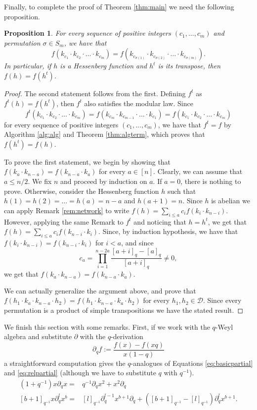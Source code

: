\documentclass[10pt]{amsart}
\newtheorem{Prop}[Lem]{Proposition}
\theoremstyle{definition}
\newcommand{\D}{\mathcal{D}}
\begin{document}
Finally, to complete the proof of Theorem \ref{thm:main} we need the following proposition.
\begin{Prop}
For every sequence of positive integers $(c_1,\ldots, c_m)$ and permutation $\sigma\in S_m$, we have that
\[
f(k_{c_1}\cdot k_{c_2}\cdot\ldots \cdot k_{c_m})=f(k_{c_{\sigma(1)}}\cdot k_{c_{\sigma(2)}}\cdot\ldots\cdot k_{c_{\sigma(m)}}).
\]
In particular, if $h$ is a Hessenberg function and $h^t$ is its transpose, then $f(h)=f(h^t)$.
\end{Prop}
\begin{proof}
The second statement follows from the first. Defining $f^t$ as $f^t(h)=f(h^t)$, then $f^t$ also satisfies the modular law. Since
\[
f^t(k_{c_1}\cdot k_{c_2}\cdot\ldots \cdot k_{c_m})=f(k_{c_m}\cdot k_{c_{m-1}}\cdot\ldots \cdot k_{c_1})=f(k_{c_1}\cdot k_{c_2}\cdot\ldots \cdot k_{c_m})
\]
for every sequence of positive integers $(c_1,\ldots, c_m)$, we have that $f^t=f$ by Algorithm \ref{alg:alg} and Theorem \ref{thm:algterm}, which proves that $f(h^t)=f(h)$.\par

To prove the first statement, we begin by showing that $f(k_a\cdot k_{n-a})=f(k_{n-a}\cdot k_a)$ for every $a\in [n]$. Clearly, we can assume that $a\leq n/2$. We fix $n$ and proceed by induction on $a$.  If $a=0$, there is nothing to prove. Otherwise, consider the Hessenberg function $h$ such that $h(1)=h(2)=\ldots=h(a)=n-a$ and $h(a+1)=n$. Since $h$ is abelian we can apply Remark \ref{rem:network} to write $f(h)=\sum_{i\leq a} c_i f(k_i\cdot k_{n-i})$. However, applying the same Remark to $f^t$ and noticing that $h=h^t$, we get that $f(h)=\sum_{i\leq a} c_if(k_{n-i}\cdot k_i)$. Since, by induction hypothesis, we have that $f(k_i\cdot k_{n-i})=f(k_{n-i}\cdot k_i)$ for $i<a$, and since
\[
c_a=\prod_{i=1}^{n-2a} \frac{[a+i]_q-[a]_q}{[a+i]_q}\neq 0,
\]
we get that $f(k_a\cdot k_{n-a})=f(k_{n-a}\cdot k_a)$. \par
  We can actually generalize the argument above, and prove that $f(h_1\cdot k_a\cdot k_{n-a}\cdot h_2)=f(h_1\cdot k_{n-a}\cdot k_a\cdot h_2)$ for every $h_1,h_2\in \D$. Since every permutation is a product of simple transpositions we have the stated result.
\end{proof}

We finish this section with some remarks. First, if we work with the $q$-Weyl algebra and substitute $\partial$ with the $q$-derivation
\[
\partial_q f:=\frac{f(x)-f(xq)}{x(1-q)}
\]
a straightforward computation gives the $q$-analogues of Equations \eqref{eq:basicpartial} and \eqref{eq:relpartial} (although we have to substitute $q$ with $q^{-1}$).
\begin{align*}
    (1+q^{-1})x\partial_qx=&q^{-1}\partial_qx^2+x^2\partial_q\\
    [b+1]_{q^{-1}}x\partial_q^lx^b=&[l]_{q^{-1}}\partial_q^{l-1}x^{b+1}\partial_q+([b+1]_{q^{-1}}-[l]_{q^{-1}})\partial_q^lx^{b+1}.
\end{align*}
\end{document}
